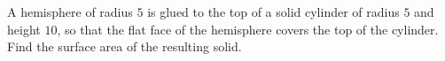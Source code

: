 A hemisphere of radius $5$ is glued to the top of a solid cylinder of radius $5$ and height $10$, so that the flat face of the hemisphere covers the top of the cylinder. Find the surface area of the resulting solid.
